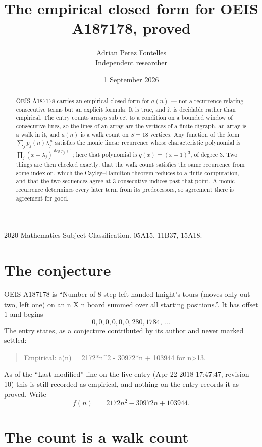 \documentclass[11pt,a4paper]{article}
\title{The empirical closed form for OEIS A187178, proved}
\author{Adrian Perez Fontelles\\ \small Independent researcher}
\date{1 September 2026}
\theoremstyle{plain}
\theoremstyle{definition}
\begin{document}
\maketitle

\begin{abstract}
OEIS A187178 carries an empirical closed form for $a(n)$ --- not a recurrence relating
consecutive terms but an explicit formula. It is true, and it is decidable rather than
empirical. The entry counts arrays subject to a condition on a bounded window of consecutive lines, so the lines of an array are the
vertices of a finite digraph, an array is a walk in it, and $a(n)$ is a walk count on
$S=18$ vertices. Any function of the form $\sum_j p_j(n)\lambda_j^{\,n}$ satisfies the
monic linear recurrence whose characteristic polynomial is
$\prod_j(x-\lambda_j)^{\deg p_j+1}$; here that polynomial is $q(x)=(x-1)^{3}$, of degree
$3$. Two things are then checked exactly: that the walk count satisfies the same
recurrence from some index on, which the Cayley--Hamilton theorem reduces to a finite
computation, and that the two sequences agree at $3$ consecutive indices past that
point. A monic recurrence determines every later term from its predecessors, so agreement
there is agreement for good.
\end{abstract}

\noindent\small 2020 Mathematics Subject Classification. 05A15, 11B37, 15A18.\normalsize

\section{The conjecture}

OEIS A187178 is ``Number of 8-step left-handed knight's tours (moves only out two, left one) on an n X n board summed over all starting positions.''. It has offset $1$ and begins
\[
0, 0, 0, 0, 0, 0, 280, 1784,\ \dots
\]
The entry states, as a conjecture contributed by its author and never marked settled:
\begin{quote}
Empirical: a(n) = 2172*n\^{}2 - 30972*n + 103944 for n>13.
\end{quote}
As of the ``Last modified'' line on the live entry (Apr 22 2018 17:47:47, revision 10) this is still
recorded as empirical, and nothing on the entry records it as proved. Write
\[
f(n)\;=\;2172 n^{2} - 30972 n + 103944.
\]

\section{The count is a walk count}
\end{document}
